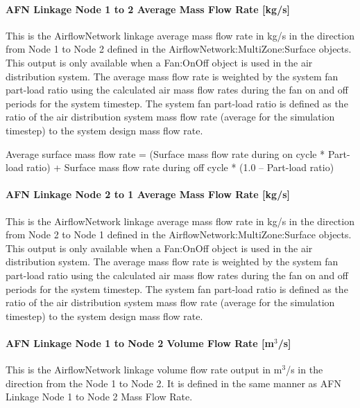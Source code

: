 \paragraph{AFN Linkage Node 1 to 2 Average Mass Flow Rate {[}kg/s{]}}\label{afn-linkage-node-1-to-2-average-mass-flow-rate-kgs}

This is the AirflowNetwork linkage average mass flow rate in kg/s in the direction from Node 1 to Node 2 defined in the AirflowNetwork:MultiZone:Surface objects. This output is only available when a Fan:OnOff object is used in the air distribution system. The average mass flow rate is weighted by the system fan part-load ratio using the calculated air mass flow rates during the fan on and off periods for the system timestep. The system fan part-load ratio is defined as the ratio of the air distribution system mass flow rate (average for the simulation timestep) to the system design mass flow rate.

Average surface mass flow rate = (Surface mass flow rate during on cycle * Part-load ratio) + Surface mass flow rate during off cycle * (1.0 -- Part-load ratio)

\paragraph{AFN Linkage Node 2 to 1 Average Mass Flow Rate {[}kg/s{]}}\label{afn-linkage-node-2-to-1-average-mass-flow-rate-kgs}

This is the AirflowNetwork linkage average mass flow rate in kg/s in the direction from Node 2 to Node 1 defined in the AirflowNetwork:MultiZone:Surface objects. This output is only available when a Fan:OnOff object is used in the air distribution system. The average mass flow rate is weighted by the system fan part-load ratio using the calculated air mass flow rates during the fan on and off periods for the system timestep. The system fan part-load ratio is defined as the ratio of the air distribution system mass flow rate (average for the simulation timestep) to the system design mass flow rate.

\paragraph{AFN Linkage Node 1 to Node 2 Volume Flow Rate {[}m\(^{3}\)/s{]}}\label{afn-linkage-node-1-to-node-2-volume-flow-rate-m3s}

This is the AirflowNetwork linkage volume flow rate output in m\(^{3}\)/s in the direction from the Node 1 to Node 2. It is defined in the same manner as AFN Linkage Node 1 to Node 2 Mass Flow Rate.

